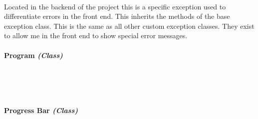 \begin{FlushLeft}
    \begin{figure}[H]
        \centering
    \end{figure}\\
    Located in the backend of the project this is a specific exception used to differentiate errors in the front end. This inherits the methods of the base exception class. This is the same as all other custom exception classes. They exist to allow me in the front end to show special error messages.
    \bk

    \paragraph{Program \textit{(Class)}} \mbox{} \\

    \begin{figure}[H]
        \centering
    \end{figure}\\

    \bk

    \paragraph{Progress Bar \textit{(Class)}} \mbox{} \\


\end{FlushLeft}
